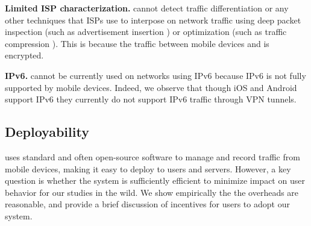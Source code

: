 \noindent\textbf{Limited ISP characterization.} \platname{} cannot detect traffic 
differentiation or any other techniques that ISPs use to interpose on network 
traffic using deep packet inspection (such as
advertisement insertion ) or optimization
(such as traffic compression ). This is because the traffic between mobile devices and \platname{}
is encrypted.

\noindent\textbf{IPv6.} \platname{} cannot be currently used on networks using IPv6
because IPv6 is not fully supported by mobile devices. Indeed, we
observe that though iOS and Android support IPv6 they currently do not
support IPv6 traffic through VPN tunnels.


\subsection{Deployability}
\platname{} uses standard and often open-source software to 
manage and record traffic from mobile devices, making it easy 
to deploy to users and servers. However, a key question is whether 
the system is sufficiently efficient to minimize impact on user behavior 
for our studies in the wild. We show empirically the the overheads are 
reasonable, and provide a brief discussion of incentives for users to 
adopt our system.

